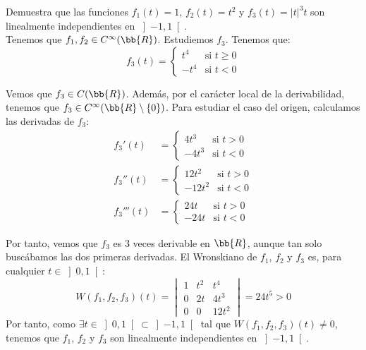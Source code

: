 \documentclass[12pt]{article}
\begin{document}
    \begin{ejercicio}
        Demuestra que las funciones $f_1(t) = 1$, $f_2(t) = t^2$ y $f_3(t) = |t|^3 t$ son linealmente independientes en $\left]-1, 1\right[$.\\

        Tenemos que $f_1,f_2\in C^\infty(\bb{R})$. Estudiemos $f_3$. Tenemos que:
        \begin{equation*}
            f_3(t) = \begin{cases}
                t^4 & \text{si } t\geq 0\\
                -t^4 & \text{si } t<0
            \end{cases}
        \end{equation*}

        Vemos que $f_3\in C(\bb{R})$. Además, por el carácter local de la derivabilidad, tenemos que $f_3\in C^\infty(\bb{R}\setminus\{0\})$. Para estudiar el caso del origen, calculamos las derivadas de $f_3$:
        \begin{align*}
            f_3'(t) &= \begin{cases}
                4t^3 & \text{si } t>0\\
                -4t^3 & \text{si } t<0
            \end{cases}\\
            f_3''(t) &= \begin{cases}
                12t^2 & \text{si } t>0\\
                -12t^2 & \text{si } t<0
            \end{cases}\\
            f_3'''(t) &= \begin{cases}
                24t & \text{si } t>0\\
                -24t & \text{si } t<0
            \end{cases}
        \end{align*}

        Por tanto, vemos que $f_3$ es $3$ veces derivable en $\bb{R}$, aunque tan solo buscábamos las dos primeras derivadas. El Wronskiano de $f_1$, $f_2$ y $f_3$ es, para cualquier $t\in \left]0,1\right[$:
        \begin{equation*}
            W(f_1,f_2,f_3)(t) = \begin{vmatrix}
                1 & t^2 & t^4\\
                0 & 2t & 4t^3\\
                0 & 0 & 12t^2
            \end{vmatrix} = 24t^5>0
        \end{equation*}
        Por tanto, como $\exists t\in \left]0,1\right[\subset \left]-1,1\right[$ tal que $W(f_1,f_2,f_3)(t)\neq 0$, tenemos que $f_1$, $f_2$ y $f_3$ son linealmente independientes en $\left]-1,1\right[$.
    \end{ejercicio}
\end{document}
